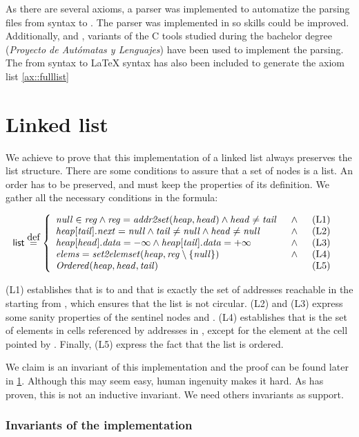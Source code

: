 As there are several axioms, a parser was implemented to automatize the parsing files from \spass syntax to \leap. 
%
The parser was implemented in \ocaml so \ocaml skills could be improved. Additionally,  and , \ocaml variants of the \mbox{C} tools studied during the bachelor degree (\textit{Proyecto de Autómatas y Lenguajes}) have been used to implement the parsing.
%
The  from \spass syntax to \LaTeX\; syntax has also been included to generate the axiom list \ref{ax::fulllist}



\section{Linked list}
\label{proof:Preserve}


We achieve to prove that this implementation of a linked list always preserves the list structure. 
%
There are some conditions to assure that a set of nodes is a list.
%
An order has to be preserved, \head and \tail must keep the properties of its definition. 
%
We gather all the necessary conditions in the formula:


	\begin{align*}
	  	\invPreserve & \overset{\mbox{def}}{=} \formulaFullListReducedBody
	\end{align*}

(L1) establishes that \fNull is to \region and that \region is
exactly the set of addresses reachable in the \heap starting from
\head, which ensures that the list is not circular.
%
(L2) and (L3) express some sanity properties of the sentinel nodes
\head and \tail.
%
(L4) establishes that \elements is the set of elements in cells 
referenced by addresses in \region, except for the element at the cell 
pointed by \fNull.
%
Finally, (L5) express the fact that the list is ordered.

We claim \invPreserve is an invariant of this implementation and the proof can be found later in \ref{proof:Preserve}. 
%
Although this may seem easy, human ingenuity makes it hard. 
%
As  has proven, this is not an inductive invariant. 
%
We need others invariants as support.

\subsubsection{Invariants of the implementation}

\label{invariants}



